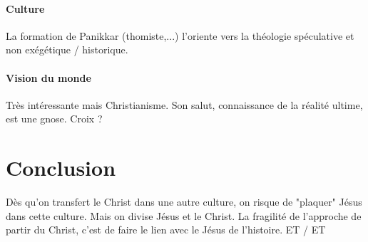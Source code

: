 \paragraph{Culture} La formation de Panikkar (thomiste,...) l'oriente vers la théologie spéculative et non exégétique / historique. 

\paragraph{Vision du monde} Très intéressante mais Christianisme. Son salut, connaissance de la réalité ultime, est une gnose. Croix ?



\section{Conclusion}

\begin{Synthesis}
Dès qu'on transfert le Christ dans une autre culture, on risque de "plaquer" Jésus dans cette culture. Mais on divise Jésus et le Christ. 
La fragilité de l'approche de partir du Christ, c'est de faire le lien avec le Jésus de l'histoire. ET / ET
\end{Synthesis}

 






























































